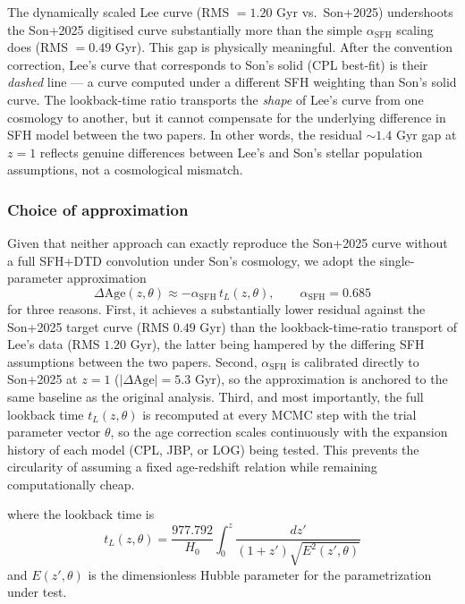 \documentclass[12pt, a4paper]{article}
\begin{document}
The dynamically scaled Lee curve (RMS $= 1.20$ Gyr vs.\ Son+2025) undershoots the Son+2025 digitised curve substantially more than the simple $\alpha_\mathrm{SFH}$ scaling does (RMS $= 0.49$ Gyr). This gap is physically meaningful. After the convention correction, Lee's curve that corresponds to Son's solid (CPL best-fit) is their \emph{dashed} line — a curve computed under a different SFH weighting than Son's solid curve. The lookback-time ratio transports the \emph{shape} of Lee's curve from one cosmology to another, but it cannot compensate for the underlying difference in SFH model between the two papers. In other words, the residual ${\sim}1.4$ Gyr gap at $z=1$ reflects genuine differences between Lee's and Son's stellar population assumptions, not a cosmological mismatch.

\subsubsection*{Choice of approximation}

Given that neither approach can exactly reproduce the Son+2025 curve without a full SFH+DTD convolution under Son's cosmology, we adopt the single-parameter approximation
\begin{equation}
    \Delta \text{Age}(z,\theta) \approx -\alpha_\mathrm{SFH}\,t_L(z,\theta), \qquad \alpha_\mathrm{SFH} = 0.685
\end{equation}
for three reasons. First, it achieves a substantially lower residual against the Son+2025 target curve (RMS $0.49$ Gyr) than the lookback-time-ratio transport of Lee's data (RMS $1.20$ Gyr), the latter being hampered by the differing SFH assumptions between the two papers. Second, $\alpha_\mathrm{SFH}$ is calibrated directly to Son+2025 at $z=1$ ($|\Delta\text{Age}|=5.3$ Gyr), so the approximation is anchored to the same baseline as the original analysis. Third, and most importantly, the full lookback time $t_L(z,\theta)$ is recomputed at every MCMC step with the trial parameter vector $\theta$, so the age correction scales continuously with the expansion history of each model (CPL, JBP, or LOG) being tested. This prevents the circularity of assuming a fixed age-redshift relation while remaining computationally cheap.

where the lookback time is
\begin{equation}
    t_L(z, \theta) = \frac{977.792}{H_0} \int_0^z \frac{dz'}{(1+z') \sqrt{E^2(z', \theta)}}
\end{equation}
and $E(z', \theta)$ is the dimensionless Hubble parameter for the parametrization under test.
\end{document}

